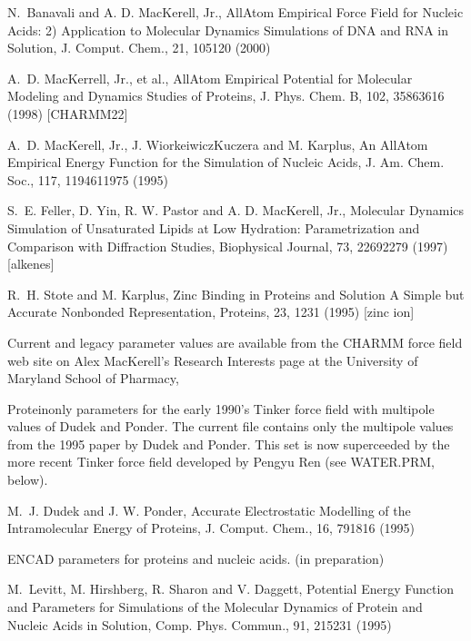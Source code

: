 \documentclass[letterpaper,11pt,english]{sphinxmanual}
\begin{document}
N. Banavali and A. D. MacKerell, Jr., All\sphinxhyphen{}Atom Empirical Force Field for Nucleic Acids: 2) Application to Molecular Dynamics Simulations of DNA and RNA in Solution, J. Comput. Chem., 21, 105\sphinxhyphen{}120 (2000)

A. D. MacKerrell, Jr., et al., All\sphinxhyphen{}Atom Empirical Potential for Molecular Modeling and Dynamics Studies of Proteins, J. Phys. Chem. B, 102, 3586\sphinxhyphen{}3616 (1998)  {[}CHARMM22{]}

A. D. MacKerell, Jr., J. Wiorkeiwicz\sphinxhyphen{}Kuczera and M. Karplus, An All\sphinxhyphen{}Atom Empirical Energy Function for the Simulation of Nucleic Acids, J. Am. Chem. Soc., 117, 11946\sphinxhyphen{}11975 (1995)

S. E. Feller, D. Yin, R. W. Pastor and A. D. MacKerell, Jr., Molecular Dynamics Simulation of Unsaturated Lipids at Low Hydration: Parametrization and Comparison with Diffraction Studies, Biophysical Journal, 73, 2269\sphinxhyphen{}2279 (1997)  {[}alkenes{]}

R. H. Stote and M. Karplus, Zinc Binding in Proteins and Solution \sphinxhyphen{} A Simple but Accurate Nonbonded Representation, Proteins, 23, 12\sphinxhyphen{}31 (1995)  {[}zinc ion{]}

Current and legacy parameter values are available from the CHARMM force field web site on Alex MacKerell’s  Research Interests page at the University of Maryland School of Pharmacy, 


Protein\sphinxhyphen{}only parameters for the early 1990’s Tinker force field with multipole values of Dudek and Ponder. The current file contains only the multipole values from the 1995 paper by Dudek and Ponder. This set is now superceeded by the more recent Tinker force field developed by Pengyu Ren (see WATER.PRM, below).

M. J. Dudek and J. W. Ponder, Accurate Electrostatic Modelling of the Intramolecular Energy of Proteins, J. Comput. Chem., 16, 791\sphinxhyphen{}816 (1995)


ENCAD parameters for proteins and nucleic acids.  (in preparation)

M. Levitt, M. Hirshberg, R. Sharon and V. Daggett, Potential Energy Function and Parameters for Simulations of the Molecular Dynamics of Protein and Nucleic Acids in Solution, Comp. Phys. Commun., 91, 215\sphinxhyphen{}231 (1995)
\end{document}
